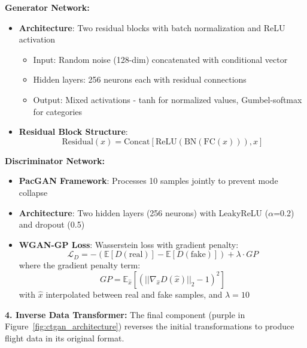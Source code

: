 \documentclass[conference]{IEEEtran}
\begin{document}
\textbf{Generator Network:} 
\begin{itemize}
    \item \textbf{Architecture}: Two residual blocks with batch normalization and ReLU activation
    \begin{itemize}
        \item Input: Random noise (128-dim) concatenated with conditional vector
        \item Hidden layers: 256 neurons each with residual connections
        \item Output: Mixed activations - tanh for normalized values, Gumbel-softmax for categories
    \end{itemize}
    \item \textbf{Residual Block Structure}:
    \begin{equation}
    \text{Residual}(x) = \text{Concat}[\text{ReLU}(\text{BN}(\text{FC}(x))), x]
    \end{equation}
\end{itemize}

\textbf{Discriminator Network:}
\begin{itemize}
    \item \textbf{PacGAN Framework}: Processes 10 samples jointly to prevent mode collapse
    \item \textbf{Architecture}: Two hidden layers (256 neurons) with LeakyReLU ($\alpha$=0.2) and dropout (0.5)
    \item \textbf{WGAN-GP Loss}: Wasserstein loss with gradient penalty:
    \begin{equation}
    \mathcal{L}_D = -(\mathbb{E}[D(\text{real})] - \mathbb{E}[D(\text{fake})]) + \lambda \cdot GP
    \end{equation}
    where the gradient penalty term:
    \begin{equation}
    GP = \mathbb{E}_{\hat{x}} \left[ (||\nabla_{\hat{x}} D(\hat{x})||_2 - 1)^2 \right]
    \end{equation}
    with $\hat{x}$ interpolated between real and fake samples, and $\lambda = 10$
\end{itemize}

\textbf{4. Inverse Data Transformer:} The final component (purple in Figure~\ref{fig:ctgan_architecture}) reverses the initial transformations to produce flight data in its original format.
\end{document}
